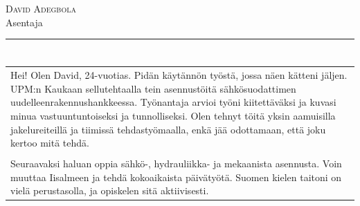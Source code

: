 \documentclass[a4paper,11pt]{article}
\begin{document}
\begin{cvheader}
\par{\centering
		{\Huge \textsc{David Adegbola}}\\[0.4em]
		{\Large Asentaja}
	\bigskip\par}

\hrule
\vspace{0.5em}
\end{cvheader}

\section{}
\begin{tabular}{p{}}
 Hei! Olen David, 24-vuotias. Pidän käytännön työstä, jossa näen kätteni jäljen. UPM:n Kaukaan sellutehtaalla tein asennustöitä sähkösuodattimen uudelleenrakennushankkeessa. Työnantaja arvioi työni kiitettäväksi ja kuvasi minua vastuuntuntoiseksi ja tunnolliseksi. Olen tehnyt töitä yksin aamuisilla jakelureiteillä ja tiimissä tehdastyömaalla, enkä jää odottamaan, että joku kertoo mitä tehdä.\\\\

 Seuraavaksi haluan oppia sähkö-, hydrauliikka- ja mekaanista asennusta. Voin muuttaa Iisalmeen ja tehdä kokoaikaista päivätyötä. Suomen kielen taitoni on vielä perustasolla, ja opiskelen sitä aktiivisesti.
\end{tabular}

\section{}
\end{document}
